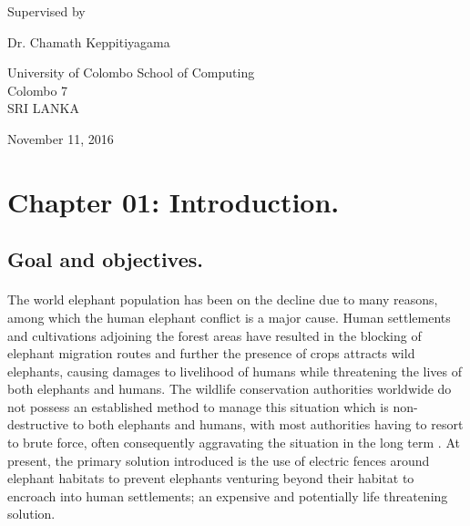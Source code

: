 \documentclass[11pt]{article}
\numberwithin{figure}{section}
\numberwithin{table}{section}
\begin{document}
\begin{titlepage}
	\vfill    
	
	{Supervised by}
	
	\vspace*{0.3\baselineskip}
	
	{\Large Dr. Chamath Keppitiyagama}
	

	
	\vspace*{0.5\baselineskip}
	
	
	
	\vfill
	
	{University of Colombo School of Computing\\
		Colombo 7\\
		SRI LANKA}
	
	\vfill
	{November 11, 2016}
	


\end{titlepage}

\newpage
\section*{Chapter 01: Introduction.}
\subsection{Goal and objectives.}
\paragraph{}
The world elephant population has been on the decline \cite {13} due to many reasons, among which the human elephant conflict is a major cause. Human settlements and cultivations adjoining the forest areas have resulted in the blocking of elephant migration routes and further  the presence of crops attracts wild elephants, causing damages to livelihood of humans while threatening the lives of both elephants and humans. The wildlife conservation authorities worldwide do not possess an established method to manage this situation which is non-destructive to both elephants and humans, with most authorities having to resort to brute force, often consequently aggravating the situation in the long term \cite {13}. At present, the primary solution introduced is the use of electric fences around elephant habitats to prevent elephants venturing beyond their habitat to encroach into human settlements; an expensive and potentially life threatening solution. 
\end{document}
